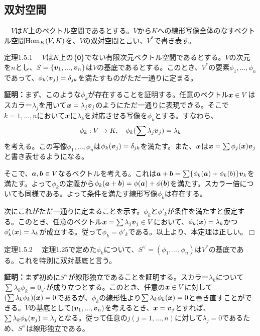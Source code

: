 \documentclass[dvipdfmx, 9pt, a4paper]{jsarticle}
\numberwithin{equation}{subsection}
\newcommand{\bm}[1]{{\mbox{\boldmath $#1$}}}
\def\qed{\hfill $\Box$}
\begin{document}
\subsection{双対空間}
\begin{tcolorbox}[title=双対空間]
　$V$は$K$上のベクトル空間であるとする。$V$から$K$への線形写像全体のなすベクトル空間${\rm Hom}_K(V, K)$を、$V$の双対空間と言い、$V^*$で書き表す。
\end{tcolorbox}
\begin{itembox}[l]{定理1.5.1}
　$V$は$K$上の$\{ \bm 0 \}$でない有限次元ベクトル空間であるとする。$V$の次元を$n$とし、$S=\{ \bm v_1, ..., \bm v_n\}$は$V$の基底であるとする。このとき、$V^*$の要素$\phi_1, ..., \phi_n$であって、$\phi_k(\bm v_j)=\delta_{jk}$を満たすものがただ一通りに定まる。
\end{itembox}
{\bf 証明：}まず、このような$\phi_k$が存在することを証明する。任意のベクトル$\bm x \in V$はスカラー$\lambda_j$を用いて$\bm x=\lambda_j\bm v_j$のようにただ一通りに表現できる。そこで$k=1, ..., n$において$\bm x$に$\lambda_k$を対応させる写像を$\phi_k$とする。すなわち、
\begin{equation}
\phi_k:V \to K,~~~\phi_k(\sum \lambda_j \bm v_j)=\lambda_k \notag
\end{equation}
を考える。この写像$\phi_1, ..., \phi_n$は$\phi_k(\bm v_j)=\delta_{jk}$を満たす。また、$\bm x$は$\bm x=\sum \phi_j(\bm x)\bm v_j$と書き表せるようになる。\par
そこで、$\bm a, \bm b \in V$なるベクトルを考える。これは$\bm a+\bm b=\sum\{\phi_k(\bm a)+\phi_k(b)\}\bm v_k$を満たす。よって$\phi_k$の定義から$\phi_k(\bm a+\bm b)=\phi(\bm a)+\phi(\bm b)$を満たす。スカラー倍についても同様である。よって条件を満たす線形写像$\phi_k$は存在する。\par
次にこれがただ一通りに定まることを示す。$\phi_k$と$\phi'_k$が条件を満たすと仮定する。このとき、任意のベクトル$\bm x=\sum \lambda_j \bm v_j \in V$において、$\phi_k(\bm x)=\lambda_k$かつ$\phi'_k(\bm x)=\lambda_k$が成立する。従って$\phi_k=\phi'_k$である。以上より、本定理は正しい。\qed
\begin{itembox}[l]{定理1.5.2}
　定理1.25で定めた$\phi_k$について、$S^\vee =(\phi_1, ..., \phi_n)$は$V^*$の基底である。これを特別に双対基底と言う。
\end{itembox}
{\bf 証明：}まず初めに$S^\vee$が線形独立であることを証明する。スカラー$\lambda_k$について$\sum \lambda_k\phi_k=0_{V^*}$が成り立つとする。このとき、任意の$\bm x \in V$に対して$(\sum \lambda_k\phi_k)(\bm x)=0$であるが、$\phi_k$の線形性より$\sum \lambda_k\phi_k(\bm x)=0$と書き直すことができる。$V$の基底として$(\bm v_1, ..., \bm v_n)$を考えるとき、$\bm x=\bm v_j$とすれば、$\sum \lambda_k\phi_k(\bm v_j)=\lambda_j$となる。従って任意の$j(j=1, ..., n)$に対して$\lambda_j=0$であるため、$S^\vee$は線形独立である。\par
\end{document}
